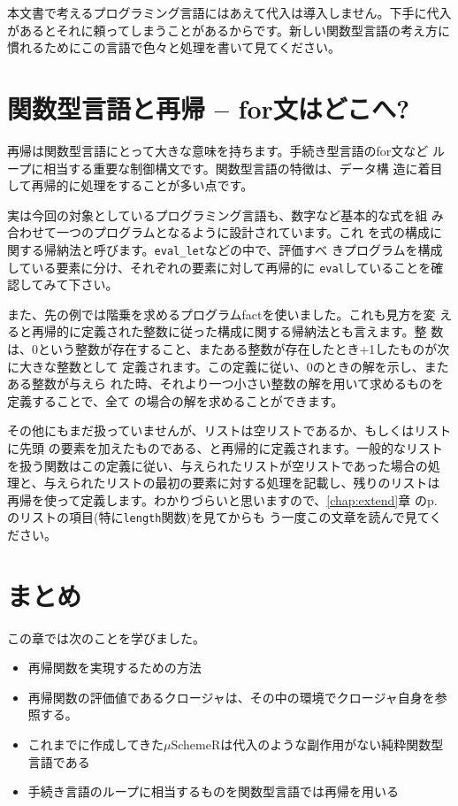 本文書で考えるプログラミング言語にはあえて代入は導入しません。下手に代入があるとそれに頼ってしまうことがあるからです。新しい関数型言語の考え方に慣れるためにこの言語で色々と処理を書いて見てください。


\section{関数型言語と再帰 -- for文はどこへ?}

再帰は関数型言語にとって大きな意味を持ちます。手続き型言語のfor文など
ループに相当する重要な制御構文です。関数型言語の特徴は、データ構
造に着目して再帰的に処理をすることが多い点です。

実は今回の対象としているプログラミング言語も、数字など基本的な式を組
み合わせて一つのプログラムとなるように設計されています。これ
を式の構成に関する帰納法と呼びます。{\tt eval\_let}などの中で、評価すべ
きプログラムを構成している要素に分け、それぞれの要素に対して再帰的に
{\tt eval}していることを確認してみて下さい。

また、先の例では階乗を求めるプログラムfactを使いました。これも見方を変
えると再帰的に定義された整数に従った構成に関する帰納法とも言えます。整
数
は、0という整数が存在すること、またある整数が存在したとき+1したものが次に大きな整数として
定義されます。この定義に従い、0のときの解を示し、またある整数が与えら
れた時、それより一つ小さい整数の解を用いて求めるものを定義することで、全て
の場合の解を求めることができます。

その他にもまだ扱っていませんが、リストは空リストであるか、もしくはリストに先頭
の要素を加えたものである、と再帰的に定義されます。一般的なリスト
を扱う関数はこの定義に従い、与えられたリストが空リストであった場合の処
理と、与えられたリストの最初の要素に対する処理を記載し、残りのリストは
再帰を使って定義します。わかりづらいと思いますので、\ref{chap:extend}章
のp. \pageref{sec:list}のリストの項目(特に{\tt length}関数)を見てからも
う一度この文章を読んで見てください。


\section{まとめ}

この章では次のことを学びました。

\begin{itemize}
\item 再帰関数を実現するための方法
\item 再帰関数の評価値であるクロージャは、その中の環境でクロージャ自身を参照する。
\item これまでに作成してきた$\mu$SchemeRは代入のような副作用がない純粋関数型言語である
\item 手続き言語のループに相当するものを関数型言語では再帰を用いる
\end{itemize}

